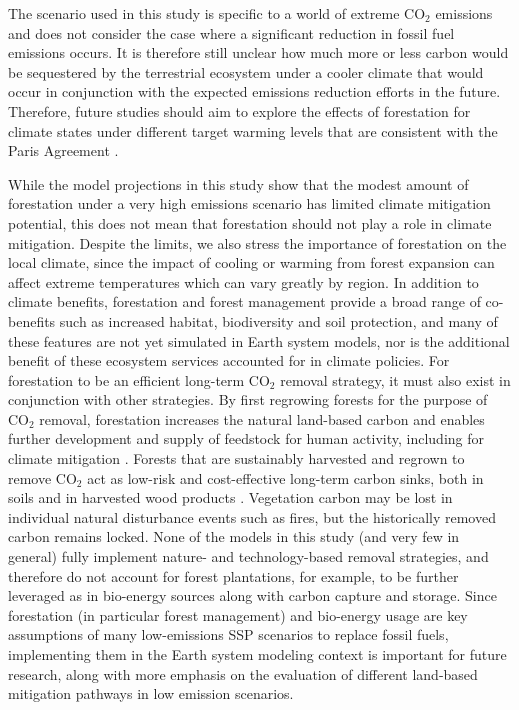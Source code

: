 \documentclass[draft]{agujournal2019}
\begin{document}
The scenario used in this study is specific to a world of extreme CO$_2$ emissions and does not consider the case where a significant reduction in fossil fuel emissions occurs.
It is therefore still unclear how much more or less carbon would be sequestered by the terrestrial ecosystem under a cooler climate that would occur in conjunction with the expected emissions reduction efforts in the future.
Therefore, future studies should aim to explore the effects of forestation for climate states under different target warming levels that are consistent with the Paris Agreement \cite <for example>{king_studying_2021}.

While the model projections in this study show that the modest amount of forestation under a very high emissions scenario has limited climate mitigation potential, this does not mean that forestation should not play a role in climate mitigation.
Despite the limits, we also stress the importance of forestation on the local climate, since the impact of cooling or warming from forest expansion can affect extreme temperatures which can vary greatly by region.
In addition to climate benefits, forestation and forest management provide a broad range of co-benefits such as increased habitat, biodiversity and soil protection, and many of these features are not yet simulated in Earth system models, nor is the additional benefit of these ecosystem services accounted for in climate policies.
For forestation to be an efficient long-term CO$_2$ removal strategy, it must also exist in conjunction with other strategies.
By first regrowing forests for the purpose of CO$_2$ removal, forestation increases the natural land-based carbon and enables further development and supply of feedstock for human activity, including for climate mitigation \cite{geng_review_2017}.
Forests that are sustainably harvested and regrown to remove CO$_2$ act as low-risk and cost-effective long-term carbon sinks, both in soils and in harvested wood products \cite{schulze_climate_2020,soimakallio_trade-offs_2021}.
Vegetation carbon may be lost in individual natural disturbance events such as fires, but the historically removed carbon remains locked.
None of the models in this study (and very few in general) fully implement nature- and technology-based removal strategies, and therefore do not account for forest plantations, for example, to be further leveraged as in bio-energy sources along with carbon capture and storage.
Since forestation (in particular forest management) and bio-energy usage are key assumptions of many low-emissions SSP scenarios to replace fossil fuels, implementing them in the Earth system modeling context is important for future research, along with more emphasis on the evaluation of different land-based mitigation pathways in low emission scenarios.
\end{document}
